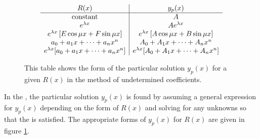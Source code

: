 \begin{figure}
\caption{This table shows the form of the particular solution $y_p(x)$ for a given
$R(x)$ in the method of undetermined coefficients.}
\label{ode fig:muc}
$$\begin{array}{c|c}
R(x) & y_p(x) \\
\hline
\hbox{constant} & A \\
e^{\lambda x} & Ae^{\lambda x} \\
e^{\lambda x}\left[E\cos\mu x+F\sin\mu x\right] & e^{\lambda x}
\left[A\cos\mu x+B\sin\mu x\right] \\
a_0+a_1x+\cdots+a_nx^n & A_0+A_1x+\cdots+A_nx^n \\
e^{\lambda x}[a_0+a_1x+\cdots+a_nx^n] & e^{\lambda x}[A_0+A_1x+\cdots+A_nx^n] 
\end{array}$$
\end{figure}

In the , the particular solution
$y_p(x)$ is found by assuming a general expression for $y_p(x)$ depending on the 
form of $R(x)$ and solving for any unknowns so that the \ODE is satisfied.
The appropriate forms of $y_p(x)$ for $R(x)$ are given in figure
\ref{ode fig:muc}. 

